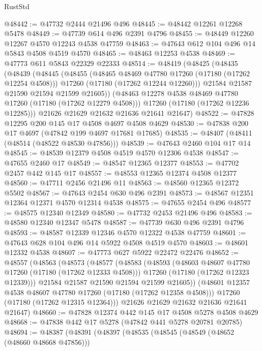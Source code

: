 \begin{lexlean}{RustStd}
\begin{coremodule}
{\begin{coremodule}
{{{{{{{{{{{{{{{{{{{{{{{{{{{{{{{{{{{{{{{{{{{{{{{{{{{{{{{@48442 := @47732 @2444 @21496 @496
@48445 := @48442 @12261 @12268 @5478
@48449 := @47739 @614 @496 @2391 @4796
@48455 := @48449 @12260 @12267 @4570 @12243 @4538 @47759
@48463 := @47643 @612 @104 @496 @14 @5843 @4508 @4519 @4570
@48465 := @48463 @12253 @4538
@48469 := @47773 @611 @5843 @22329 @22333
@48514 := @48419
    (@48425
      (@48435
        (@48439
          (@48445
            (@48455
              (@48465 @48469 @47780 @17260 (@17180 (@17262 @12254 @4508)))
              @17260
              (@17180 (@17262 @12244 @12260)))
            @21584
            @21587
            @21590
            @21594
            @21599
            @21605))
        (@48463 @12278 @4538 @48469 @47780 @17260 (@17180 (@17262 @12279 @4508)))
        @17260
        (@17180 (@17262 @12236 @12285)))
      @21626
      @21629
      @21632
      @21636
      @21641
      @21647)
@48522 := @47828 @12295 @200 @145 @17 @4508 @4697 @4508 @4629
@48530 := @47838 @200 @17 @4697 (@47842 @199 @4697 @17681 @17685)
@48535 := @48407 (@48411 (@48514 (@48522 @48530 @47856)))
@48539 := @47643 @2460 @104 @17 @14
@48545 := @48539 @12379 @4508 @4519 @4570 @12306 @4538
@48547 := @47655 @2460 @17
@48549 := @48547 @12365 @12377
@48553 := @47702 @2457 @442 @145 @17
@48557 := @48553 @12365 @12374 @4508 @12377
@48560 := @47711 @2456 @21496 @11
@48563 := @48560 @12365 @12372 @5502
@48567 := @47643 @2454 @630 @496 @2391
@48573 := @48567 @12351 @12364 @12371 @4570 @12314 @4538
@48575 := @47655 @2454 @496
@48577 := @48575 @12340 @12349
@48580 := @47732 @2453 @21496 @496
@48583 := @48580 @12340 @12347 @5478
@48587 := @47739 @630 @496 @2391 @4796
@48593 := @48587 @12339 @12346 @4570 @12322 @4538 @47759
@48601 := @47643 @628 @104 @496 @14 @5922 @4508 @4519 @4570
@48603 := @48601 @12332 @4538
@48607 := @47773 @627 @5922 @22472 @22476
@48652 := @48557
    (@48563
      (@48573
        (@48577
          (@48583
            (@48593
              (@48603 @48607 @47780 @17260 (@17180 (@17262 @12333 @4508)))
              @17260
              (@17180 (@17262 @12323 @12339)))
            @21584
            @21587
            @21590
            @21594
            @21599
            @21605))
        (@48601 @12357 @4538 @48607 @47780 @17260 (@17180 (@17262 @12358 @4508)))
        @17260
        (@17180 (@17262 @12315 @12364)))
      @21626
      @21629
      @21632
      @21636
      @21641
      @21647)
@48660 := @47828 @12374 @442 @145 @17 @4508 @5278 @4508 @4629
@48668 := @47838 @442 @17 @5278 (@47842 @441 @5278 @20781 @20785)
@48694 := @48387
    (@48391
      (@48397
        (@48535
          (@48545
            (@48549 (@48652 (@48660 @48668 @47856)))
}}}}}}}}}}}}}}}}}}}}}}}}}}}}}}}}}}}}}}}}}}}}}}}}}}}}}}}
\end{coremodule}}
\end{coremodule}
\end{lexlean}
